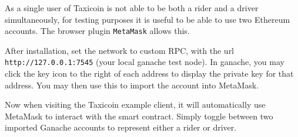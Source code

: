 As a single user of Taxicoin is not able to be both a rider and a driver simultaneously, for testing purposes it is useful to be able to use two Ethereum accounts. The browser plugin \lstinline{MetaMask} allows this.

After installation, set the network to custom RPC, with the url \texttt{http://127.0.0.1:7545} (your local ganache test node). In ganache, you may click the key icon to the right of each address to display the private key for that address. You may then use this to import the account into MetaMask.

Now when visiting the Taxicoin example client, it will automatically use MetaMask to interact with the smart contract. Simply toggle between two imported Ganache accounts to represent either a rider or driver.

